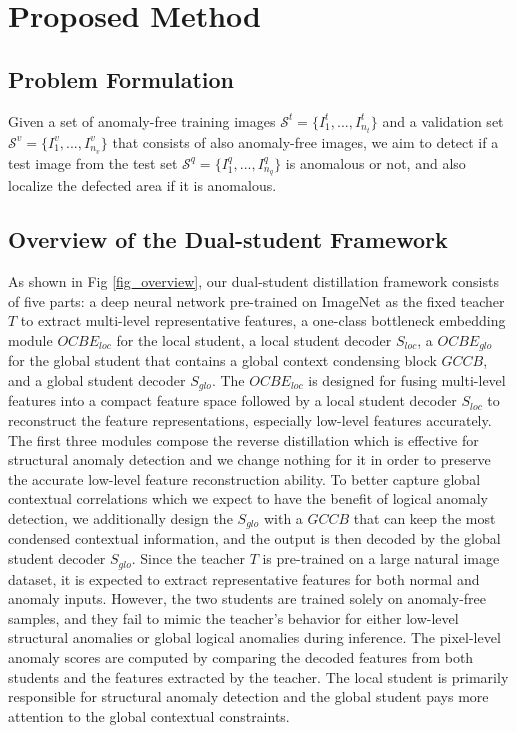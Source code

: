 \documentclass[10pt,twocolumn,letterpaper]{article}
\begin{document}
\section{Proposed Method}
\subsection{Problem Formulation}
Given a set of anomaly-free training images $ \mathcal{S}^t=\{I_1^t, ..., I_{n_t}^t\}$ and a validation set $ \mathcal{S}^v=\{I_1^v, ..., I_{n_v}^v\}$ that consists of also anomaly-free images, we aim to detect if a test image from the test set $ \mathcal{S}^q=\{I_1^q, ..., I_{n_q}^q\}$ is anomalous or not, and also localize the defected area if it is anomalous.

\subsection{Overview of the Dual-student Framework} 
As shown in Fig \ref{fig_overview}, our dual-student distillation framework consists of five parts: a deep neural network pre-trained on ImageNet as the fixed teacher $T$ to extract multi-level representative features, a one-class bottleneck embedding module $OCBE_{loc}$ for the local student, a local student decoder $S_{loc}$, a $OCBE_{glo}$ for the global student that contains a global context condensing block $GCCB$, and a global student decoder $S_{glo}$. The $OCBE_{loc}$ is designed for fusing multi-level features into a compact feature space followed by a local student decoder $S_{loc}$ to reconstruct the feature representations, especially low-level features accurately. The first three modules compose the reverse distillation \cite{deng2022anomaly} which is effective for structural anomaly detection and we change nothing for it in order to preserve the accurate low-level feature reconstruction ability. To better capture global contextual correlations which we expect to have the benefit of logical anomaly detection, we additionally design the $S_{glo}$ with a $GCCB$ that can keep the most condensed contextual information, and the output is then decoded by the global student decoder $S_{glo}$. Since the teacher $T$ is pre-trained on a large natural image dataset, it is expected to extract representative features for both normal and anomaly inputs. However, the two students are trained solely on anomaly-free samples, and they fail to mimic the teacher's behavior for either low-level structural anomalies or global logical anomalies during inference. The pixel-level anomaly scores are computed by comparing the decoded features from both students and the features extracted by the teacher. The local student is primarily responsible for structural anomaly detection and the global student pays more attention to the global contextual constraints.
\end{document}
